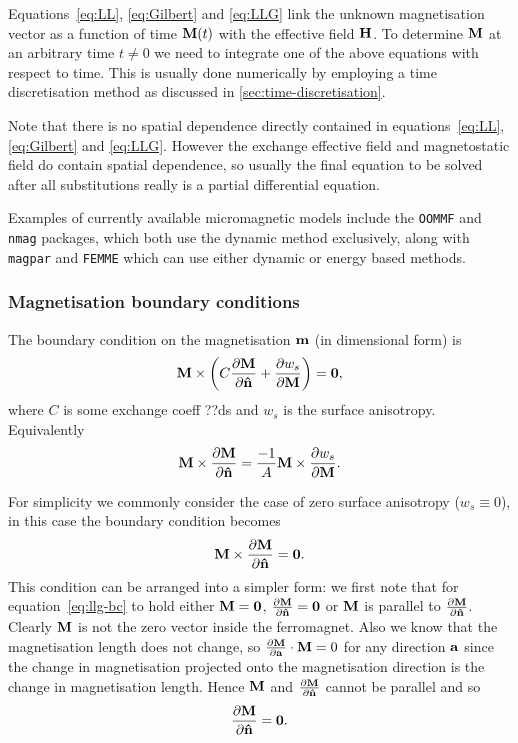 Equations~\eqref{eq:LL}, \eqref{eq:Gilbert} and \eqref{eq:LLG} link the unknown magnetisation vector as a function of time $\mathbf{M}(t)$ with the effective field $\mathbf{H}$. To determine $\mathbf{M}$ at an arbitrary time $t \neq 0$ we need to integrate one of the above equations with respect to time. This is usually done numerically by employing a time discretisation method as discussed in \autoref{sec:time-discretisation}.

Note that there is no spatial dependence directly contained in equations~\eqref{eq:LL}, \eqref{eq:Gilbert} and \eqref{eq:LLG}. However the exchange effective field and magnetostatic field do contain spatial dependence, so usually the final equation to be solved after all substitutions really is a partial differential equation.

Examples of currently available micromagnetic models include the \texttt{OOMMF}\cite{oommf-website} and \texttt{nmag}\cite{Fischbacher2007} packages, which both use the dynamic method exclusively, along with \texttt{magpar}\cite{Scholz2003} and \texttt{FEMME}\cite{suessco-website} which can use either dynamic or energy based methods.


\subsubsection{Magnetisation boundary conditions}
\label{sec:magn-bound-cond}

The boundary condition on the magnetisation $\mathbf{m}$ (in dimensional form) is \cite[pgs. 178, 181]{Aharoni1996}
\begin{equation}
  \mathbf{M} \times {\left(  C \frac{\partial \mathbf{M}}{\partial \mathbf{\hat{n}}}+ \frac{\partial w_s}{\partial \mathbf{M}} \right)} = \mathbf{0},
\end{equation}
where $C$ is some exchange coeff ??ds and $w_s$ is the surface anisotropy.
Equivalently
\begin{equation}
    \mathbf{M} \times \frac{\partial \mathbf{M}}{\partial \mathbf{\hat{n}}} = \frac{-1}{A} \mathbf{M} \times \frac{\partial w_s}{\partial \mathbf{M}}.
\end{equation}

For simplicity we commonly consider the case of zero surface anisotropy ($w_s \equiv 0$), in this case the boundary condition becomes
\begin{equation}
  \label{eq:llg-bc}
  \mathbf{M} \times \frac{\partial \mathbf{M}}{\partial \mathbf{\hat{n}}} = \mathbf{0}.
\end{equation}
This condition can be arranged into a simpler form: we first note that for equation~\eqref{eq:llg-bc} to hold either $\mathbf{M} = \mathbf{0}$, $\frac{\partial \mathbf{M}}{\partial \mathbf{\hat{n}}} = \mathbf{0}$ or $\mathbf{M}$ is parallel to $\frac{\partial \mathbf{M}}{\partial \mathbf{\hat{n}}}$.
Clearly $\mathbf{M}$ is not the zero vector inside the ferromagnet.
Also we know that the magnetisation length does not change, so $\frac{\partial \mathbf{M}}{\partial {\mathbf{a}}} \cdot \mathbf{M} = 0$ for any direction ${\mathbf{a}}$ since the change in magnetisation projected onto the magnetisation direction is the change in magnetisation length.
Hence $\mathbf{M}$ and $\frac{\partial \mathbf{M}}{\partial \mathbf{\hat{n}}}$ cannot be parallel and so
\begin{equation}
  \frac{\partial \mathbf{M}}{\partial \mathbf{\hat{n}}} = \mathbf{0}.
\end{equation}

